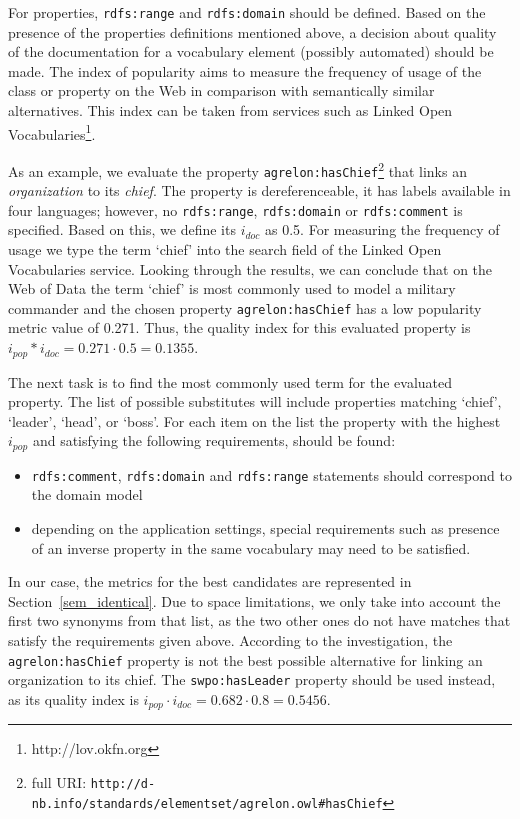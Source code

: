 For properties, \texttt{rdfs:range} and \texttt{rdfs:domain} should be defined.
Based on the presence of the properties definitions mentioned above, a decision about quality of the documentation for a vocabulary element (possibly automated) should be made.
The index of popularity aims to measure the frequency of usage of the class or property on the Web in comparison with semantically similar alternatives.
This index can be taken from services such as Linked Open Vocabularies\footnote{http://lov.okfn.org}.

As an example, we evaluate the property \texttt{agrelon:hasChief}\footnote{full URI: \texttt{http://d-nb.info/standards/elementset/agrelon.owl\#hasChief}} that links an \emph{organization} to its \emph{chief}.
The property is dereferenceable, it has labels available in four languages; however, no \texttt{rdfs:range}, \texttt{rdfs:domain} or \texttt{rdfs:comment} is specified.
Based on this, we define its $i_\mathit{doc}$ as 0.5.
For measuring the frequency of usage we type the term `chief' into the search field of the Linked Open Vocabularies service. 
Looking through the results, we can conclude that on the Web of Data the term `chief' is most commonly used to model a military commander and the chosen property \texttt{agrelon:hasChief} has a low popularity metric value of 0.271.
Thus, the quality index for this evaluated property is $i_\mathit{pop} * i_\mathit{doc} = 0.271 \cdot 0.5 = 0.1355$.

The next task is to find the most commonly used term for the evaluated property.
The list of possible substitutes will include properties matching `chief', `leader', `head', or `boss'.
For each item on the list the property with the highest $i_\mathit{pop}$ and satisfying the following requirements, should be found:
\begin{itemize}
\item \texttt{rdfs:comment}, \texttt{rdfs:domain} and \texttt{rdfs:range} statements should correspond to the domain model
\item depending on the application settings, special requirements such as presence of an inverse property in the same vocabulary may need to be satisfied. 
\end{itemize}

In our case, the metrics for the best candidates are represented in Section~\ref{sem_identical}.
Due to space limitations, we only take into account the first two synonyms from that list, as the two other ones do not have matches that satisfy the requirements given above.
According to the investigation, the \texttt{agrelon:hasChief} property is not the best possible alternative for linking an organization to its chief.
The \texttt{swpo:hasLeader} property should be used instead, as its quality index is $i_\mathit{pop} \cdot i_\mathit{doc} = 0.682 \cdot 0.8 = 0.5456$.

